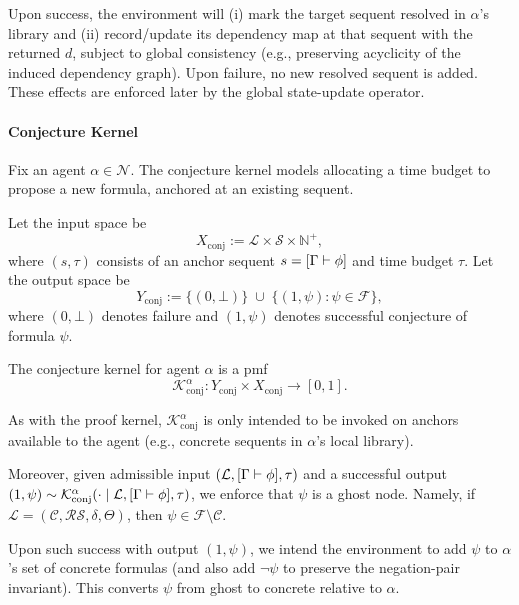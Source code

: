 Upon success, the environment will (i) mark the target sequent resolved in $\alpha$'s library and
(ii) record/update its dependency map at that sequent with the returned $d$, subject to global consistency
(e.g., preserving acyclicity of the induced dependency graph). Upon failure, no new resolved sequent is added.
These effects are enforced later by the global state-update operator.

\paragraph{Conjecture Kernel}

Fix an agent $\alpha\in\mathcal{N}$. The conjecture kernel models allocating a time budget to propose a new formula,
anchored at an existing sequent.

Let the input space be
\[
X_{\mathrm{conj}} :=\mathscr{L}\times \mathcal{S}\times \mathbb{N}^+,
\]
where $(s,\tau)$ consists of an anchor sequent $s=[\Gamma\vdash\phi]$ and time budget $\tau$.
Let the output space be
\[
Y_{\mathrm{conj}} := \{(0,\bot)\}\;\cup\;\{(1,\psi): \psi\in\mathcal{F}\},
\]
where $(0,\bot)$ denotes failure and $(1,\psi)$ denotes successful conjecture of formula $\psi$.

The conjecture kernel for agent $\alpha$ is a pmf
\[
\mathcal{K}^{\alpha}_{\mathrm{conj}} : Y_{\mathrm{conj}}\times X_{\mathrm{conj}} \to [0,1].
\]

As with the proof kernel, $\mathcal{K}^{\alpha}_{\mathrm{conj}}$ is only intended to be invoked on anchors available to the agent (e.g., concrete sequents in $\alpha$'s local library).

Moreover, given admissible input $(\mathcal L, [\Gamma \vdash \phi], \tau)$ and a successful output $(1,\psi) \sim \mathcal{K}_{\mathrm{conj}}^\alpha (\cdot \mid \mathcal L, [\Gamma \vdash \phi], \tau)$, we enforce that $\psi$ is a ghost node. Namely, if $\mathcal{L} = (\mathcal{C},\mathcal{RS},\delta,\Theta)$, then $\psi \in \mathcal{F} \setminus \mathcal{C}$.


Upon such success with output $(1,\psi)$, we intend the environment to add $\psi$ to $\alpha$'s set of concrete formulas (and also add $\neg\psi$ to preserve the negation-pair invariant). This converts $\psi$ from ghost to concrete relative to $\alpha$.

